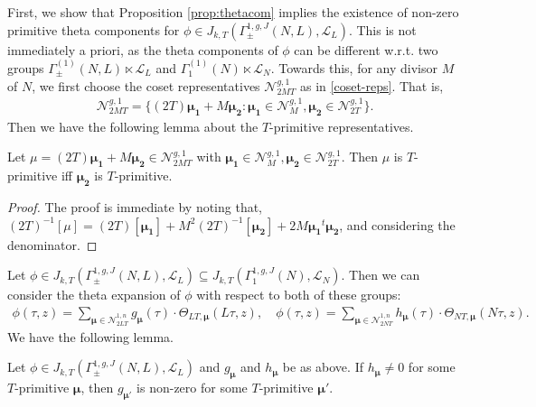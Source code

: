\documentclass[11pt]{amsart}
\numberwithin{equation}{section}
\newcommand{\mc}{\mathcal}
\newcommand{\q}{\quad}
\begin{document}
First, we show that Proposition \ref{prop:thetacom} implies the existence of non-zero primitive theta components for $\phi\in J_{k, T}(\Gamma_\pm^{1,g, J}(N, L), \mc L_L)$. This is not immediately a priori, as the theta components of $\phi$ can be different w.r.t. two groups $\Gamma_\pm^{(1)}(N, L)\ltimes \mc L_L$ and $\Gamma_1^{(1)}(N)\ltimes \mc L_N$. Towards this, for any divisor $M$ of $N$, we first choose the coset representatives $\mc N_{2MT}^{g,1}$ as in \eqref{coset-reps}. That is,
\begin{align}\label{coset-repsN}
  \mc N_{2MT}^{g,1}=\{(2T)\bm{\mu_1}+M\bm{\mu_2}: \bm{\mu_1} \in  \mc N_{M}^{g,1}, \bm{\mu_2} \in \mc N_{2T}^{g,1} \}.
\end{align}
Then we have the following lemma about the $T$-primitive representatives.
\begin{lemma}\label{lem:cosNNT}
    Let $\mu=(2T)\bm{\mu_1}+M\bm{\mu_2}\in \mc N_{2MT}^{g,1} $ with $ \bm{\mu_1} \in  \mc N_{M}^{g,1}, \bm{\mu_2} \in \mc N_{2T}^{g,1}$. Then $\mu$ is $T$-primitive iff  $\bm{\mu_2}$ is $T$-primitive.
\end{lemma}
\begin{proof}
    The proof is immediate by noting that,  $(2T)^{-1}[\mu]=(2T)[\bm{\mu_1}]+M^2(2T)^{-1}[\bm{\mu_2}]+ 2M \bm{\mu_1}^t\bm{\mu_2}$, and considering the denominator.
\end{proof}
Let $\phi\in J_{k, T}(\Gamma_\pm^{1,g, J}(N, L), \mc L_L) \subseteq J_{k, T}(\Gamma_1^{1,g,J}(N), \mc L_N)$. Then we can consider the theta expansion of $\phi$ with respect to both of these groups:
\begin{align}
    \phi(\tau, z)=\sum_{\bm\mu\in \mc N_{2LT}^{1,n}} g_{\bm\mu}(\tau)\cdot \Theta_{LT, \bm\mu}(L\tau,z), \q \phi(\tau, z)=\sum_{\bm\mu\in \mc N_{2NT}^{1,n}} h_{\bm\mu}(\tau)\cdot \Theta_{NT, \bm\mu}(N\tau,z).
\end{align}
We have the following lemma.
\begin{lemma}
    Let $\phi\in J_{k, T}(\Gamma_\pm^{1,g, J}(N, L), \mc L_L)$ and $g_{\bm\mu}$ and $h_{\bm\mu}$ be as above. If $h_{\bm\mu}\neq 0$ for some $T$-primitive $\bm\mu$, then $g_{\bm\mu'}$ is non-zero for some $T$-primitive $\bm\mu'$.
\end{lemma}
\end{document}
